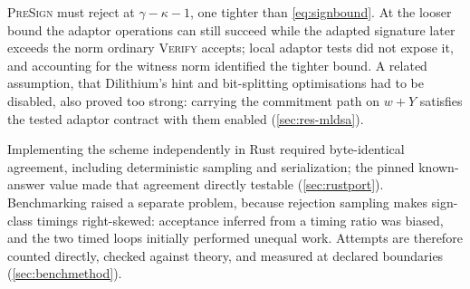 %
\textsc{PreSign} must reject at $\gamma-\kappa-1$, one tighter than \cref{eq:signbound}.
At the looser bound the adaptor operations can still succeed while the adapted signature
later exceeds the norm ordinary \textsc{Verify} accepts; local adaptor tests did not expose
it, and accounting for the witness norm identified the tighter bound. A related assumption,
that Dilithium's hint and bit-splitting optimisations had to be disabled, also proved too
strong: carrying the commitment path on $w+Y$ satisfies the tested adaptor contract with
them enabled (\cref{sec:res-mldsa}).

Implementing the scheme independently in Rust required byte-identical agreement, including
deterministic sampling and serialization; the pinned known-answer value made that agreement
directly testable (\cref{sec:rustport}). Benchmarking raised a separate problem, because
rejection sampling makes sign-class timings right-skewed: acceptance inferred from a timing
ratio was biased, and the two timed loops initially performed unequal work. Attempts are
therefore counted directly, checked against theory, and measured at declared boundaries
(\cref{sec:benchmethod}).

